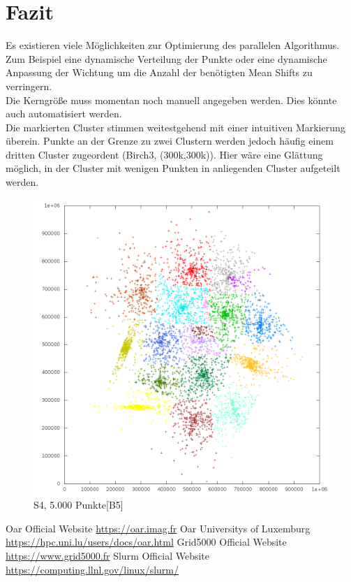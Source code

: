 \section{Fazit}
	Es existieren viele Möglichkeiten zur Optimierung des parallelen Algorithmus. Zum Beispiel eine dynamische Verteilung der Punkte oder eine dynamische Anpassung
	der Wichtung um die Anzahl der benötigten Mean Shifts zu verringern.\\
	Die Kerngröße muss momentan noch manuell angegeben werden. Dies könnte auch automatisiert werden.\\
	Die markierten Cluster stimmen weitestgehend mit einer intuitiven Markierung überein. Punkte an der Grenze zu zwei Clustern werden jedoch häufig einem 
	dritten Cluster zugeordent (Birch3, (300k,300k)). Hier wäre eine Glättung möglich, in der Cluster mit wenigen Punkten in anliegenden Cluster aufgeteilt werden.\\
	\begin{figure}[H]
		\centering
		\includegraphics[scale=0.6]{../meanshift/output/pics/s4_colored.png} 
		\caption{S4, 5.000 Punkte[B5]}
	\end{figure}
\begin{thebibliography}{999}
	    \bibitem [0] {} Oar Official Website \url{https://oar.imag.fr}
	    \bibitem [1] {} Oar Universitys of Luxemburg \url{https://hpc.uni.lu/users/docs/oar.html}
	    \bibitem [2] {} Grid5000 Official Website \url{https://www.grid5000.fr}
	    \bibitem [3] {} Slurm Official Website \url{https://computing.llnl.gov/linux/slurm/}
	\newline
\end{thebibliography}
